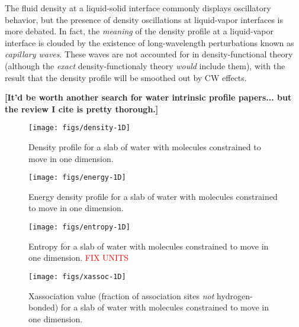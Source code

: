 \documentclass[letterpaper,twocolumn,amsmath,amssymb,prb]{revtex4-1}
\newcommand{\red}[1]{{\bf \color{red} #1}}
\newcommand{\fixme}[1]{\red{[#1]}}
\begin{document}
The fluid density at a liquid-solid interface commonly displays
oscillatory behavior, but the presence of density oscillations at
liquid-vapor interfaces is more debated\cite{penfold2001structure}.
In fact, the \emph{meaning} of the density profile at a liquid-vapor
interface is clouded by the existence of long-wavelength perturbations
known as \emph{capillary waves}.  These waves are not accounted for in
density-functional theory (although the \emph{exact}
density-functionaly theory \emph{would} include them), with the result
that the density profile will be smoothed out by CW effects.

\fixme{It'd be worth another search for water intrinsic profile
  papers... but the review I cite is pretty thorough.}

\begin{figure}
\begin{center}
\texttt{[image: figs/density-1D]}
\end{center}
\caption{ Density profile for a slab of water with molecules constrained to move in one dimension. }
\label{fig:density-1D}
\end{figure}

\begin{figure}
\begin{center}
\texttt{[image: figs/energy-1D]}
\end{center}
\caption{ Energy density profile for a slab of water with molecules constrained to move in one dimension. }
\label{fig:energy-1D}
\end{figure}

\begin{figure}
\begin{center}
\texttt{[image: figs/entropy-1D]}
\end{center}
\caption{ Entropy for a slab of water with molecules constrained to move in one 
dimension. \textcolor{red}{FIX UNITS}}
\label{fig:entropy-1D}
\end{figure}

\begin{figure}
\begin{center}
\texttt{[image: figs/xassoc-1D]}
\end{center}
\caption{ Xassociation value (fraction of association sites
\emph{not} hydrogen-bonded) for a slab of water with molecules constrained to move in one 
dimension. }
\label{fig:xassoc-1D}
\end{figure}
\end{document}
